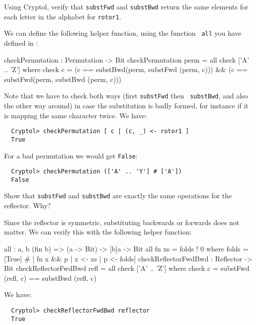\begin{Exercise}\label{ex:enigma:7}
  Using Cryptol, verify that {\tt substFwd} and {\tt substBwd} return
  the same elements for each letter in the alphabet for {\tt rotor1}.
\end{Exercise}
\begin{Answer}
  We can define the following helper function, using the function {\tt
    all} you have defined in
  :\indAll
\begin{code}
  checkPermutation : Permutation -> Bit
  checkPermutation perm = all check  ['A' .. 'Z']
    where check  c = (c == substBwd(perm, substFwd (perm, c))) 
                  && (c == substFwd(perm, substBwd (perm, c)))
\end{code}
Note that we have to check both ways (first {\tt substFwd} then {\tt
  substBwd}, and also the other way around) in case the substitution
is badly formed, for instance if it is mapping the same character
twice. We have:
\begin{Verbatim}
  Cryptol> checkPermutation [ c | (c, _) <- rotor1 ]
  True
\end{Verbatim}
For a bad permutation we would get {\tt False}:
\begin{Verbatim}
  Cryptol> checkPermutation (['A' .. 'Y'] # ['A'])
  False
\end{Verbatim}
\end{Answer}

\begin{Exercise}\label{ex:enigma:8}
  Show that {\tt substFwd} and {\tt substBwd} are exactly the same
  operations for the reflector. Why?
\end{Exercise}
\begin{Answer}
  Since the reflector is symmetric, substituting backwards or forwards
  does not matter. We can verify this with the following helper
  function:\indAll
\begin{code}
  all : {a, b} (fin b) => (a -> Bit) -> [b]a -> Bit
  all fn xs = folds ! 0 where
    folds = [True] # [ fn x && p | x <- xs
                                 | p <- folds]
  checkReflectorFwdBwd : Reflector -> Bit
  checkReflectorFwdBwd refl = all check ['A' .. 'Z']
    where check c = substFwd (refl, c) == substBwd (refl, c)
\end{code}
We have:
\begin{Verbatim}
  Cryptol> checkReflectorFwdBwd reflector
  True
\end{Verbatim}
\end{Answer}

